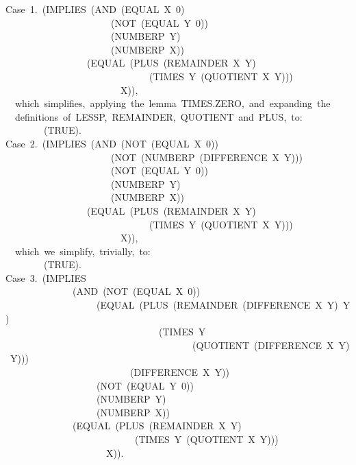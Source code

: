 \documentclass[11pt]{book}
\newenvironment{pubasis}{\begin{flushleft}\ttfamily\small}{\normalsize\rmfamily\end{flushleft}}
\begin{document}
\begin{pubasis}
Case~1.~(IMPLIES~(AND~(EQUAL~X~0)\\
~~~~~~~~~~~~~~~~~~~~~~(NOT~(EQUAL~Y~0))\\
~~~~~~~~~~~~~~~~~~~~~~(NUMBERP~Y)\\
~~~~~~~~~~~~~~~~~~~~~~(NUMBERP~X))\\
~~~~~~~~~~~~~~~~~(EQUAL~(PLUS~(REMAINDER~X~Y)\\
~~~~~~~~~~~~~~~~~~~~~~~~~~~~~~(TIMES~Y~(QUOTIENT~X~Y)))\\
~~~~~~~~~~~~~~~~~~~~~~~~X)),\\

~~which~simplifies,~applying~the~lemma~TIMES.ZERO,~and~expanding~the\\
~~definitions~of~LESSP,~REMAINDER,~QUOTIENT~and~PLUS,~to:\\

~~~~~~~~(TRUE).\\

Case~2.~(IMPLIES~(AND~(NOT~(EQUAL~X~0))\\
~~~~~~~~~~~~~~~~~~~~~~(NOT~(NUMBERP~(DIFFERENCE~X~Y)))\\
~~~~~~~~~~~~~~~~~~~~~~(NOT~(EQUAL~Y~0))\\
~~~~~~~~~~~~~~~~~~~~~~(NUMBERP~Y)\\
~~~~~~~~~~~~~~~~~~~~~~(NUMBERP~X))\\
~~~~~~~~~~~~~~~~~(EQUAL~(PLUS~(REMAINDER~X~Y)\\
~~~~~~~~~~~~~~~~~~~~~~~~~~~~~~(TIMES~Y~(QUOTIENT~X~Y)))\\
~~~~~~~~~~~~~~~~~~~~~~~~X)),\\

~~which~we~simplify,~trivially,~to:\\

~~~~~~~~(TRUE).\\

Case~3.~(IMPLIES\\
~~~~~~~~~~~~~~(AND~(NOT~(EQUAL~X~0))\\
~~~~~~~~~~~~~~~~~~~(EQUAL~(PLUS~(REMAINDER~(DIFFERENCE~X~Y)~Y)\\
~~~~~~~~~~~~~~~~~~~~~~~~~~~~~~~~(TIMES~Y\\
~~~~~~~~~~~~~~~~~~~~~~~~~~~~~~~~~~~~~~~(QUOTIENT~(DIFFERENCE~X~Y)~Y)))\\
~~~~~~~~~~~~~~~~~~~~~~~~~~(DIFFERENCE~X~Y))\\
~~~~~~~~~~~~~~~~~~~(NOT~(EQUAL~Y~0))\\
~~~~~~~~~~~~~~~~~~~(NUMBERP~Y)\\
~~~~~~~~~~~~~~~~~~~(NUMBERP~X))\\
~~~~~~~~~~~~~~(EQUAL~(PLUS~(REMAINDER~X~Y)\\
~~~~~~~~~~~~~~~~~~~~~~~~~~~(TIMES~Y~(QUOTIENT~X~Y)))\\
~~~~~~~~~~~~~~~~~~~~~X)).\\


\end{pubasis}
\end{document}
